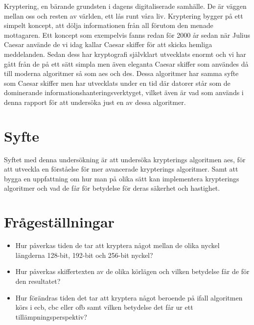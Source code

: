 
Kryptering, en bärande grundsten i dagens digitaliserade samhälle. De är väggen mellan oss och resten
av världen, ett lås runt våra liv. Kryptering bygger på ett simpelt koncept, att dölja informationen
från all förutom den menade mottagaren. Ett koncept som exempelvis fanns redan för 2000 år sedan när Julius
Caesar använde de vi idag kallar Caesar skiffer för att skicka hemliga meddelanden.
Sedan dess har kryptografi självklart utvecklats enormt och vi har gått från de på ett sätt simpla men
även eleganta Caesar skiffer som användes då till moderna algoritmer så som \acrlong{aes} och \acrlong{des}.
Dessa algoritmer har samma syfte som Caesar skiffer men har utvecklats under en tid där datorer står som
de dominerande informationshanteringsverktyget, vilket även är vad som används i denna rapport för att
undersöka just en av dessa algoritmer.

\section{Syfte} %
Syftet med denna undersökning är att undersöka krypterings algoritmen \acrshort{aes},
för att utveckla en förståelse för mer avancerade krypterings algoritmer.
Samt att bygga en uppfattning om hur man på olika sätt kan implementera
krypterings algoritmer och vad de får för betydelse för deras säkerhet och
hastighet.

\section{Frågeställningar} %
\begin{itemize}
    \setlength{\itemindent}{-1em}
    \item Hur påverkas tiden de tar att kryptera något mellan de olika nyckel längderna 128-bit,
          192-bit och 256-bit nyckel?

    \item Hur påverkas skiffertexten av de olika körlägen och vilken betydelse får de för den resultatet?

    \item Hur förändras tiden det tar att kryptera något beroende på ifall algoritmen körs i
          \acrshort{ecb}, \acrshort{cbc} eller \acrshort{ofb} samt vilken betydelse det får ur ett
          tillämpningsperspektiv?
\end{itemize}

